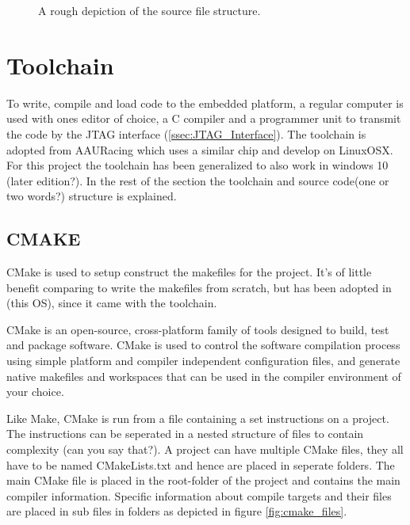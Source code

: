 \begin{figure}[H]
	\caption{A rough depiction of the source file structure.}
	\label{fig:source_structure}
\end{figure}


\section{Toolchain}
To write, compile and load code to the embedded platform,
a regular computer is used with ones editor of choice,
a C compiler and a programmer unit to transmit the code by the JTAG interface (\ref{ssec:JTAG_Interface}).
The toolchain is adopted from AAURacing\cite{aauracing} which uses a similar chip and develop on Linux\/OSX.
For this project the toolchain has been generalized to also work in windows 10 (later edition?).
In the rest of the section the toolchain and source code(one or two words?) structure is explained.

\subsection{CMAKE}
\label{ssec:cmake}
CMake is used to setup construct the makefiles for the project.
It's of little benefit comparing to write the makefiles from scratch,
but has been adopted in (this OS), since it came with the toolchain.

\begin{displayquote}
CMake is an open-source, cross-platform family of tools designed to build,
test and package software.
CMake is used to control the software compilation process
using simple platform and compiler independent configuration files,
and generate native makefiles and workspaces
that can be used in the compiler environment of your choice\cite{cmake}.
\end{displayquote}

Like Make, CMake is run from a file containing a set instructions on a project.
The instructions can be seperated in a nested structure of files to contain complexity (can you say that?).
A project can have multiple CMake files,
they all have to be named CMakeLists.txt and hence are placed in seperate folders.
The main CMake file is placed in the root-folder of the project and contains the main compiler information.
Specific information about compile targets and their files
are placed in sub files in folders as depicted in figure \ref{fig:cmake_files}.

